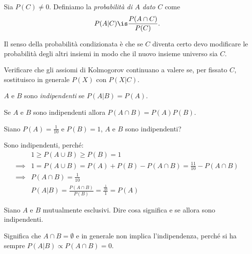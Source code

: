 \begin{definition}
	Sia $P(C)\neq 0$. Definiamo la \emph{probabilità di $A$ dato $C$} come
	\[P(A|C) \is \frac{P(A\cap C)}{P(C)}.\]
\end{definition}

\noindent Il senso della probabilità condizionata è che se $C$ diventa certo
devo modificare le probabilità degli altri insiemi in modo che il nuovo insieme universo sia $C$.

\begin{exercise}
	Verificare che gli assiomi di Kolmogorov continuano a valere se, per fissato $C$, sostituisco in generale $P(X)$ con $P(X|C)$.
\end{exercise}

\begin{definition}[Indipendenza]
	$A$ e $B$ sono \emph{indipendenti} se $P(A|B) = P(A)$.
\end{definition}

\begin{exercise}
	Se $A$ e $B$ sono indipendenti allora $P(A\cap B) = P(A)P(B)$.
\end{exercise}

\begin{exercise}
	Siano $P(A)=\frac1{10}$ e $P(B)=1$, $A$ e $B$ sono indipendenti?
\end{exercise}

\begin{solution}
	Sono indipendenti, perché:
	\begin{align*}
		&1 \ge P(A\cup B) \ge P(B) = 1 \\
		\implies &1 = P(A\cup B) = P(A) + P(B) - P(A\cap B) = \frac{11}{10} - P(A\cap B) \\
		\implies &P(A\cap B) = \frac{1}{10} \\
		&P(A|B) = \frac{P(A\cap B)}{P(B)} = \frac{\frac{1}{10}}{1} = P(A)
	\end{align*}
\end{solution}

\begin{exercise}
	Siano $A$ e $B$ mutualmente esclusivi. Dire cosa significa e se allora sono indipendenti.
\end{exercise}

\begin{solution}
	Significa che $A\cap B=\emptyset$ e in generale non implica l'indipendenza, perché si ha sempre $P(A|B)\propto P(A\cap B)=0$.
\end{solution}
